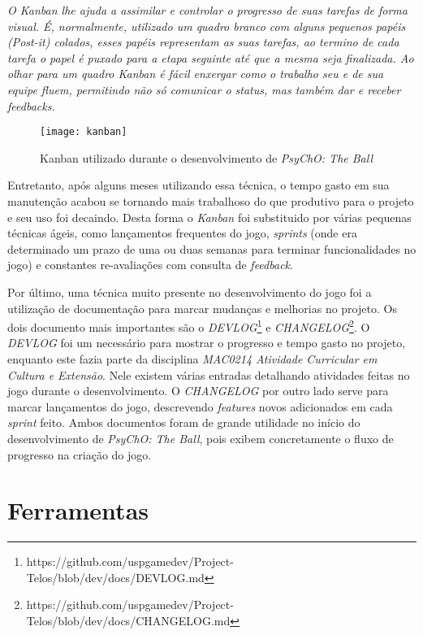 \begin{displayquote}
  \textit{O Kanban lhe ajuda a assimilar e controlar o progresso de suas tarefas de forma visual. É, normalmente, utilizado um quadro branco com alguns pequenos papéis (Post-it) colados, esses papéis representam as suas tarefas, ao termino de cada tarefa o papel é puxado para a etapa seguinte até que a mesma seja finalizada. Ao olhar para um quadro Kanban é fácil enxergar como o trabalho seu e de sua equipe fluem, permitindo não só comunicar o status, mas também dar e receber feedbacks.}
\end{displayquote}

\begin{figure}[h!]
\texttt{[image: kanban]}
\centering
\caption{Kanban utilizado durante o desenvolvimento de \textit{PsyChO: The Ball}}
\end{figure}

Entretanto, após alguns meses utilizando essa técnica, o tempo gasto em sua manutenção acabou se tornando mais trabalhoso do que produtivo para o projeto e seu uso foi decaindo. Desta forma o \textit{Kanban} foi substituido por várias pequenas técnicas ágeis, como lançamentos frequentes do jogo, \textit{sprints} (onde era determinado um prazo de uma ou duas semanas para terminar funcionalidades no jogo) e constantes re-avaliações com consulta de \textit{feedback}.

Por último, uma técnica muito presente no desenvolvimento do jogo foi a utilização de documentação para marcar mudanças e melhorias no projeto. Os dois documento mais importantes são o \textit{DEVLOG}\footnote{https://github.com/uspgamedev/Project-Telos/blob/dev/docs/DEVLOG.md} e \textit{CHANGELOG}\footnote{https://github.com/uspgamedev/Project-Telos/blob/dev/docs/CHANGELOG.md}. O \textit{DEVLOG} foi um necessário para mostrar o progresso e tempo gasto no projeto, enquanto este fazia parte da disciplina \textit{MAC0214 Atividade Curricular em Cultura e Extensão}. Nele existem várias entradas detalhando atividades feitas no jogo durante o desenvolvimento. O \textit{CHANGELOG} por outro lado serve para marcar lançamentos do jogo, descrevendo \textit{features} novos adicionados em cada \textit{sprint} feito. Ambos documentos foram de grande utilidade no início do desenvolvimento de \textit{PsyChO: The Ball}, pois exibem concretamente o fluxo de progresso na criação do jogo.

\section{Ferramentas}
\label{sec:ferramentas}

